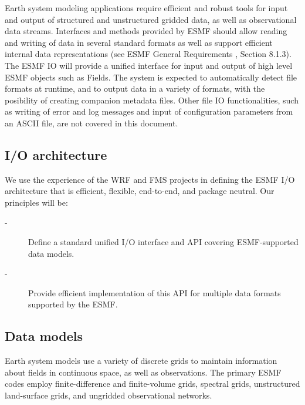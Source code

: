 

Earth system modeling applications require efficient and robust tools
for input and output of structured and unstructured gridded data, as
well as observational data streams.  Interfaces and methods provided
by ESMF should allow reading and writing of data in several standard
formats as well as support efficient internal data representations
(see ESMF General Requirements \cite{ESMFGenReq}, Section 8.1.3). 
The ESMF IO will provide a unified interface for input and output 
of high level ESMF objects such as Fields.  The system is expected to 
automatically detect file formats at runtime, and to output data in a variety 
of formats, with the posibility of creating companion metadata files. Other 
file IO functionalities, such as writing of error and log messages and input 
of configuration parameters from an ASCII file, are not covered in this
document. 

\subsection{I/O architecture}

We use the experience of the WRF \cite{WRF-Software} and FMS 
\cite{Balaji_Parallel_IO_2000}  projects in defining the 
ESMF I/O architecture that is efficient, flexible, end-to-end, and package 
neutral. Our principles will be:

\begin{description}
\item[-] Define a standard unified I/O interface and API covering 
         ESMF-supported data models.
\item[-] Provide efficient implementation of this API for multiple data 
         formats supported by the ESMF. 
\end{description}



\subsection{Data models}

Earth system models use a variety of discrete grids to maintain information 
about fields in continuous space, as well as observations. The primary ESMF 
codes employ finite-difference and finite-volume grids, spectral grids, 
unstructured land-surface grids, and ungridded observational networks.


